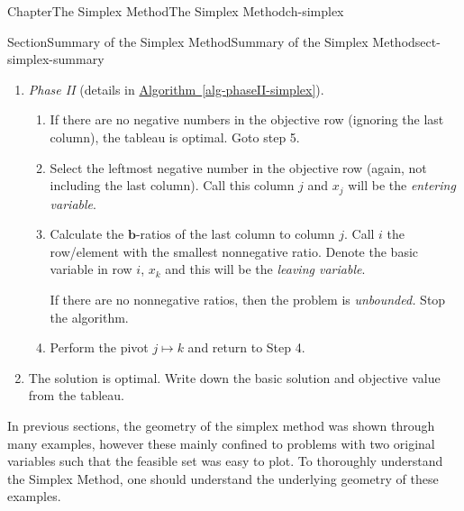 \documentclass[oneside,10pt,]{book}
\newcommand{\xreffont}{\relax}
\numberwithin{equation}{section}
\begin{document}
\begin{chapterptx}{Chapter}{The Simplex Method}{}{The Simplex Method}{}{}{ch-simplex}
\begin{sectionptx}{Section}{Summary of the Simplex Method}{}{Summary of the Simplex Method}{}{}{sect-simplex-summary}
\begin{enumerate}
\par
%
\begin{enumerate}
\item{}If there are no negatives in the last column, the tableau is already feasible and move to \emph{Phase II} in Step 4.%
\item{}Find the row with the largest negative in the last column. Denote this as row \(i\) and the last number is \(b_i\). The basic variable associated with this row is the \emph{leaving variable}. Denote it \(x_{k}\).%
\par
Find the leftmost negative parameter (that one with the smallest index) in the row. The column where this takes place will be column \(j\) and thus the entering variable will be \(x_j\).%
\par
If there are no negative parameter in row \(i\), then the tableau and thus the LOP is \emph{infeasible}. Exit the algorithm.%
\item{}Perform the pivot \(j \mapsto k\). Return to Step 3.%
\end{enumerate}
%
\item{}\emph{Phase II} (details in \hyperref[alg-phaseII-simplex]{Algorithm~{\xreffont\ref{alg-phaseII-simplex}}}).%
\par
%
\begin{enumerate}
\item{}If there are no negative numbers in the objective row (ignoring the last column), the tableau is optimal. Goto step 5.%
\item{}Select the leftmost negative number in the objective row (again, not including the last column). Call this column \(j\) and \(x_j\) will be the \emph{entering variable}.%
\item{}Calculate the \(\boldsymbol{b}\)-ratios of the last column to column \(j\). Call \(i\) the row\slash{}element with the smallest nonnegative ratio. Denote the basic variable in row \(i\), \(x_k\) and this will be the \emph{leaving variable}.%
\par
If there are no nonnegative ratios, then the problem is \emph{unbounded.} Stop the algorithm.%
\item{}Perform the pivot \(j \mapsto k\) and return to Step 4.%
\end{enumerate}
%
\item{}The solution is optimal. Write down the basic solution and objective value from the tableau.%
\end{enumerate}
%
\par
In previous sections, the geometry of the simplex method was shown through many examples, however these mainly confined to problems with two original variables such that the feasible set was easy to plot. To thoroughly understand the Simplex Method, one should understand the underlying geometry of these examples.%

\end{sectionptx}
\end{chapterptx}
\end{document}
